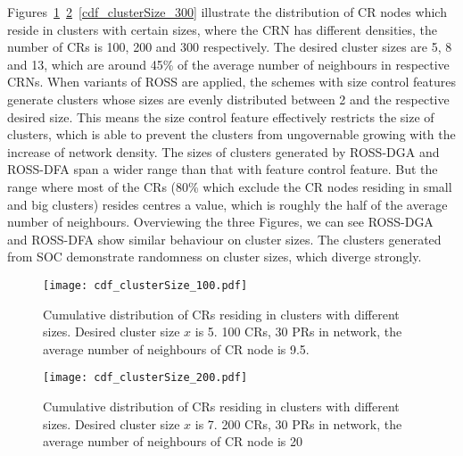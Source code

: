 Figures~\ref{cdf_clusterSize_100}~\ref{cdf_clusterSize_200}~\ref{cdf_clusterSize_300} illustrate the distribution of CR nodes which reside in clusters with certain sizes, where the CRN has different densities, \ie the number of CRs is 100, 200 and 300 respectively.
The desired cluster sizes are 5, 8 and 13, which are around 45\% of the average number of neighbours in respective CRNs. 
When variants of ROSS are applied, the schemes with size control features generate clusters whose sizes are evenly distributed between 2 and the respective desired size.
This means the size control feature effectively restricts the size of clusters, which is able to prevent the clusters from ungovernable growing with the increase of network density.
The sizes of clusters generated by ROSS-DGA and ROSS-DFA span a wider range than that with feature control feature.
But the range where most of the CRs (80\% which exclude the CR nodes residing in small and big clusters) resides centres a value, which is roughly the half of the average number of neighbours.
Overviewing the three Figures, we can see ROSS-DGA and ROSS-DFA show similar behaviour on cluster sizes.
The clusters generated from SOC demonstrate randomness on cluster sizes, which diverge strongly.

\begin{figure}[!h]
  \centering
   \texttt{[image: cdf\_clusterSize\_100.pdf]}
  \caption{Cumulative distribution of CRs residing in clusters with different sizes. Desired cluster size $x$ is 5. 100 CRs, 30 PRs in network, the average number of neighbours of CR node is 9.5.}
  \label{cdf_clusterSize_100}
\end{figure}

\begin{figure}[!h]
  \centering
   \texttt{[image: cdf\_clusterSize\_200.pdf]}
  \caption{Cumulative distribution of CRs residing in clusters with different sizes. Desired cluster size $x$ is 7. 200 CRs, 30 PRs in network, the average number of neighbours of CR node is 20}
  \label{cdf_clusterSize_200}
\end{figure}


